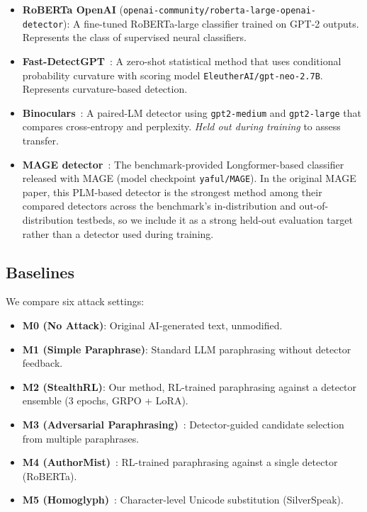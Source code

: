 \documentclass[11pt]{article}
\begin{document}
\begin{itemize}[leftmargin=*,itemsep=2pt]
  \item \textbf{RoBERTa OpenAI} (\texttt{openai-community/roberta-large-openai-detector}): A fine-tuned RoBERTa-large classifier trained on GPT-2 outputs. Represents the class of supervised neural classifiers.
  \item \textbf{Fast-DetectGPT}~\cite{bao2024fastdetectgptefficientzeroshotdetection}: A zero-shot statistical method that uses conditional probability curvature with scoring model \texttt{EleutherAI/gpt-neo-2.7B}. Represents curvature-based detection.
  \item \textbf{Binoculars}~\cite{hans2024spottingllmsbinocularszeroshot}: A paired-LM detector using \texttt{gpt2-medium} and \texttt{gpt2-large} that compares cross-entropy and perplexity. \emph{Held out during training} to assess transfer.
  \item \textbf{MAGE detector}~\cite{li2024magemachinegeneratedtextdetection}: The benchmark-provided Longformer-based classifier released with MAGE (model checkpoint \texttt{yaful/MAGE}). In the original MAGE paper, this PLM-based detector is the strongest method among their compared detectors across the benchmark's in-distribution and out-of-distribution testbeds, so we include it as a strong held-out evaluation target rather than a detector used during training.
\end{itemize}

\subsection{Baselines}

We compare six attack settings:
\begin{itemize}[leftmargin=*,itemsep=2pt]
  \item \textbf{M0 (No Attack)}: Original AI-generated text, unmodified.
  \item \textbf{M1 (Simple Paraphrase)}: Standard LLM paraphrasing without detector feedback.
  \item \textbf{M2 (StealthRL)}: Our method, RL-trained paraphrasing against a detector ensemble (3 epochs, GRPO + LoRA).
  \item \textbf{M3 (Adversarial Paraphrasing)}~\cite{cheng2025adversarialparaphrasinguniversalattack}: Detector-guided candidate selection from multiple paraphrases.
  \item \textbf{M4 (AuthorMist)}~\cite{david2025authormistevadingaitext}: RL-trained paraphrasing against a single detector (RoBERTa).
  \item \textbf{M5 (Homoglyph)}~\cite{creo2025silverspeakevadingaigeneratedtext}: Character-level Unicode substitution (SilverSpeak).
\end{itemize}
\end{document}
